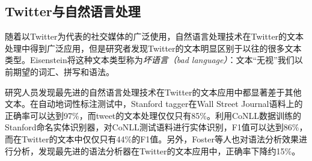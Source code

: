 \subsection{Twitter与自然语言处理}
\label{rel1}
随着以Twitter为代表的社交媒体的广泛使用，自然语言处理技术在Twitter的文本处理中得到广泛应用，但是研究者发现Twitter的文本明显区别于以往的很多文本类型。Eisenstein将这种文本类型称为\emph{坏语言（bad language）}：文本“无视”我们以前期望的词汇、拼写和语法。

研究人员发现最先进的自然语言处理技术在Twitter的文本应用中都显著差于其他文本。在自动地词性标注测试中，Stanford tagger在Wall Street Journal语料上的正确率可以达到97\%，而tweet的文本处理仅仅只有85\%。利用CoNLL数据训练的Stanford命名实体识别器，对CoNLL测试语料进行实体识别，F1值可以达到86\%，而在Twitter的文本中仅仅只有44\%的F1值。另外，Foster等人也对语法分析效果进行分析，发现最先进的语法分析器在Twitter的文本应用中，正确率下降约15\%。

